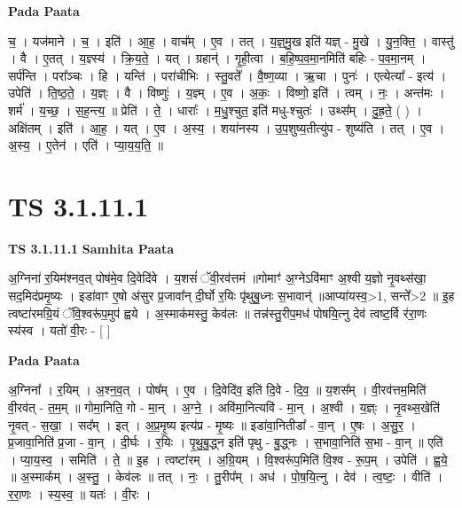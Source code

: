 \documentclass[17pt]{extarticle}
\begin{document}
\textbf{Pada Paata} \newline

च॒ । यज॑माने । च॒ । इति॑ । आ॒ह॒ । वाच᳚म् । ए॒व । तत् । य॒ज्ञ्॒मु॒ख इति॑ यज्ञ् - मु॒खे । यु॒न॒क्ति॒ । वास्तु॑ । वै । ए॒तत् । य॒ज्ञ्स्य॑ । क्रि॒य॒ते॒ । यत् । ग्रहान्॑ । गृ॒ही॒त्वा । ब॒हि॒ष्प॒व॒मा॒नमिति॑ बहिः - प॒व॒मा॒नम् । सर्प॑न्ति । परा᳚ञ्चः । हि । यन्ति॑ । परा॑चीभिः । स्तु॒वते᳚ । वै॒ष्ण॒व्या । ऋ॒चा । पुनः॑ । एत्येत्या᳚ - इत्य॑ । उपेति॑ । ति॒ष्ठ॒ते॒ । य॒ज्ञ्ः । वै । विष्णुः॑ । य॒ज्ञ्म् । ए॒व । अ॒कः॒ । विष्णो॒ इति॑ । त्वम् । नः॒ । अन्त॑मः । शर्म॑ । य॒च्छ॒ । स॒ह॒न्त्य॒ ॥ प्रेति॑ । ते॒ । धाराः᳚ । म॒धु॒श्चुत॒ इति॑ मधु-श्चुतः॑ । उथ्स᳚म् । दु॒ह्र॒ते॒ ( ) । अक्षि॑तम् । इति॑ । आ॒ह॒ । यत् । ए॒व । अ॒स्य॒ । शया॑नस्य । उ॒प॒शुष्य॒तीत्यु॑प - शुष्य॑ति । तत् । ए॒व । अ॒स्य॒ । ए॒तेन॑ । एति॑ । प्या॒य॒य॒ति॒ ॥  \newline





\section{ TS 3.1.11.1 }

\textbf{TS 3.1.11.1 } \newline
\textbf{Samhita Paata} \newline

अ॒ग्निना॑ र॒यिम॑श्नव॒त् पोष॑मे॒व दि॒वेदि॑वे । य॒शसं॑ ॅवी॒रव॑त्तमं ॥गोमाꣳ॑ अ॒ग्नेऽवि॑माꣳ अ॒श्वी य॒ज्ञो नृ॒वथ्स॑खा॒ सद॒मिद॑प्रमृ॒ष्यः । इडा॑वाꣳ ए॒षो अ॑सुर प्र॒जावा᳚न् दी॒र्घो र॒यिः पृ॑थुबु॒ध्नः स॒भावान्॑ ॥आप्या॑यस्व॒>1, सन्ते᳚>2 ॥ इ॒ह त्वष्टा॑रमग्रि॒यं ॅवि॒श्वरू॑प॒मुप॑ ह्वये । अ॒स्माक॑मस्तु॒ केव॑लः ॥ तन्न॑स्तु॒रीप॒मध॑ पोषयि॒त्नु देव॑ त्वष्ट॒र्वि र॑रा॒णः स्य॑स्व । यतो॑ वी॒रः - [  ] \newline

\textbf{Pada Paata} \newline

अ॒ग्निना᳚ । र॒यिम् । अ॒श्न॒व॒त् । पोष᳚म् । ए॒व । दि॒वेदि॑व॒ इति॑ दि॒वे - दि॒व॒ ॥ य॒शस᳚म् । वी॒रव॑त्तम॒मिति॑ वी॒रव॑त् - त॒म॒म् ॥ गोमा॒निति॒ गो - मा॒न् । अ॒ग्ने॒ । अवि॑मा॒नित्यवि॑ - मा॒न् । अ॒श्वी । य॒ज्ञ्ः । नृ॒वथ्स॒खेति॑ नृ॒वत् - स॒खा॒ । सद᳚म् । इत् । अ॒प्र॒मृ॒ष्य इत्य॑प्र - मृ॒ष्यः ॥ इडा॑वा॒नितीडा᳚ - वा॒न् । ए॒षः । अ॒सु॒र॒ । प्र॒जावा॒निति॑ प्र॒जा - वा॒न् । दी॒र्घः । र॒यिः । पृ॒थु॒बु॒द्ध्न इति॑ पृथु - बु॒द्ध्नः । स॒भावा॒निति॑ स॒भा - वा॒न् ॥ एति॑ । प्या॒य॒स्व॒ । समिति॑ । ते॒ ॥ इ॒ह । त्वष्टा॑रम् । अ॒ग्रि॒यम् । वि॒श्वरू॑प॒मिति॑ वि॒श्व - रू॒प॒म् । उपेति॑ । ह्व॒ये॒ ॥ अ॒स्माक᳚म् । अ॒स्तु॒ । केव॑लः ॥ तत् । नः॒ । तु॒रीप᳚म् । अध॑ । पो॒ष॒यि॒त्नु । देव॑ । त्व॒ष्टः॒ । वीति॑ । र॒रा॒णः । स्य॒स्व॒ ॥ यतः॑ । वी॒रः ।  \newline
\end{document}

